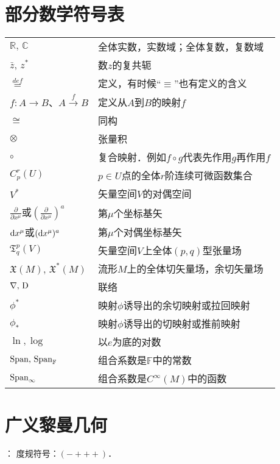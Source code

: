 \section*{部分数学符号表}
\begin{tabular}{ll}
    $\mathbb{R},\, \mathbb{C}$ & 全体实数，实数域；全体复数，复数域 \\
    $\bar{z},\,z^*$ & 数$z$的复共轭 \\
    $\overset{def}{=}$ & 定义，有时候“$\equiv$”也有定义的含义 \\
    $f:A\to B$、$A\xrightarrow{f}B$ & 定义从$A$到$B$的映射$f$ \\
    $\cong$ & 同构 \\
    $\otimes$ & 张量积 \\
    $\circ$ & 复合映射．例如$f\circ g$代表先作用$g$再作用$f$ \\
    $C^r_p(U)$ & $p\in U$点的全体$r$阶连续可微函数集合 \\
    $V^*$ & 矢量空间$V$的对偶空间 \\
    $\frac{\partial }{\partial x^\mu}$或$(\frac{\partial }{\partial x^\mu})^a$ &  第$\mu$个坐标基矢 \\
    ${\rm d}x^\mu$或$({\rm d}x^\mu)^a$ & 第$\mu$个对偶坐标基矢 \\
    $\mathfrak{T}^p_q(V)$ & 矢量空间$V$上全体$(p,q)$型张量场 \\
    $\mathfrak{X}(M),\, \mathfrak{X}^*(M)$ & 流形$M$上的全体切矢量场，余切矢量场 \\
    $\nabla,\, {\rm D}$ & 联络 \\
    $\phi^*$ & 映射$\phi$诱导出的余切映射或拉回映射 \\
    $\phi_*$ & 映射$\phi$诱导出的切映射或推前映射 \\
    $\ln, \log$ & 以$e$为底的对数 \\
    ${\rm Span},\, {\rm Span}_{\mathbb{F}}$ & 组合系数是$\mathbb{F}$中的常数 \\
    ${\rm Span}_{\infty}$ & 组合系数是$C^{\infty}(M)$中的函数 \\
\end{tabular}






\newpage

\section*{广义黎曼几何}
： 度规符号：$(- + + +)$．

